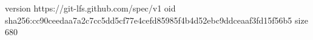 version https://git-lfs.github.com/spec/v1
oid sha256:cc90ceedaa7a2c7cc5dd5cf77e4cefd85985f4b4d52ebc9ddceaaf3fd15f56b5
size 680
